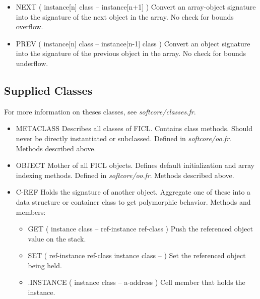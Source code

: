 \begin{;stlisting}[frame=single]
\begin{itemize}[noitemsep]
	\item NEXT ( instance[n] class -- instance[n+1] )\newline
	Convert an array-object signature into the signature of the next
	object in the array. No check for bounds overflow.

	\item PREV ( instance[n] class -- instance[n-1] class )\newline
	Convert an object signature into the signature of the previous
	object in the array. No check for bounds underflow.
\end{itemize}


\subsection{Supplied Classes}
For more information on theses classes, see \textit{softcore/classes.fr}.
\begin{itemize}[noitemsep]
	\item METACLASS\newline
	Describes all classes of FICL. Contains class methods. Should
	never be directly instantiated or subclassed. Defined in
	\textit{softcore/oo.fr}. Methods described above.

	\item OBJECT\newline
	Mother of all FICL objects. Defines default initialization and
	array indexing methods. Defined in \textit{softcore/oo.fr}.
	Methods described above.

	\item C-REF\newline
	Holds the signature of another object. Aggregate one of these
	into a data structure or container class to get polymorphic
	behavior. Methods and members:
	\begin{itemize}[noitemsep]
		\item GET ( instance class -- ref-instance ref-class )\newline
		Push the referenced object value on the stack.

		\item SET ( ref-instance ref-class instance class -- )\newline
		Set the referenced object being held.

		\item .INSTANCE ( instance class -- a-address )\newline
		Cell member that holds the instance.


\end{itemize}
\end{itemize}
\end{;stlisting}
